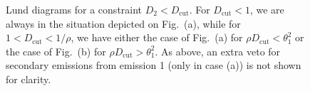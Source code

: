 \begin{figure}[t]
  \centering
  \hfill%
  \caption{Lund diagrams for a constraint $D_2<D_\text{cut}$. For
    $D_\text{cut}<1$, we are always in the situation depicted on
    Fig.~(a), while for $1<D_\text{cut}<1/\rho$, we have either the case
    of Fig.~(a) for $\rho D_\text{cut}<\theta_1^2$ or the case of
    Fig.~(b) for $\rho D_\text{cut}>\theta_1^2$. As above, an extra
    veto for secondary emissions from emission 1 (only in case (a)) is
    not shown for clarity.}\label{fig:Lund-D2-all}
\end{figure}  


